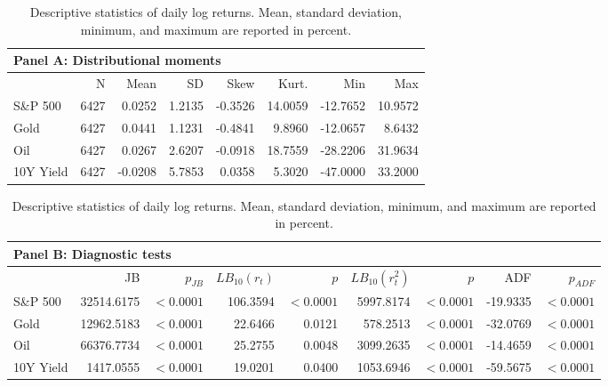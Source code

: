\begin{table}[htbp]
\centering
\small
\setlength{\tabcolsep}{5pt}
\renewcommand{\arraystretch}{1.05}
\begin{tabular}{lrrrrrrr}
\toprule
\multicolumn{8}{l}{Panel A: Distributional moments} \\
\midrule
 & N & Mean & SD & Skew & Kurt. & Min & Max \\
\midrule
S\&P 500 & 6427 & 0.0252 & 1.2135 & -0.3526 & 14.0059 & -12.7652 & 10.9572 \\
Gold & 6427 & 0.0441 & 1.1231 & -0.4841 & 9.8960 & -12.0657 & 8.6432 \\
Oil & 6427 & 0.0267 & 2.6207 & -0.0918 & 18.7559 & -28.2206 & 31.9634 \\
10Y Yield & 6427 & -0.0208 & 5.7853 & 0.0358 & 5.3020 & -47.0000 & 33.2000 \\
\bottomrule
\end{tabular}
\vspace{0.35em}

\begin{tabular}{lrrrrrrrr}
\toprule
\multicolumn{9}{l}{Panel B: Diagnostic tests} \\
\midrule
 & JB & $p_{JB}$ & $LB_{10}(r_t)$ & $p$ & $LB_{10}(r_t^2)$ & $p$ & ADF & $p_{ADF}$ \\
\midrule
S\&P 500 & 32514.6175 & $<0.0001$ & 106.3594 & $<0.0001$ & 5997.8174 & $<0.0001$ & -19.9335 & $<0.0001$ \\
Gold & 12962.5183 & $<0.0001$ & 22.6466 & 0.0121 & 578.2513 & $<0.0001$ & -32.0769 & $<0.0001$ \\
Oil & 66376.7734 & $<0.0001$ & 25.2755 & 0.0048 & 3099.2635 & $<0.0001$ & -14.4659 & $<0.0001$ \\
10Y Yield & 1417.0555 & $<0.0001$ & 19.0201 & 0.0400 & 1053.6946 & $<0.0001$ & -59.5675 & $<0.0001$ \\
\bottomrule
\end{tabular}
\caption{Descriptive statistics of daily log returns. Mean, standard deviation, minimum, and maximum are reported in percent.}
\label{tab:desc_stats}
\end{table}

